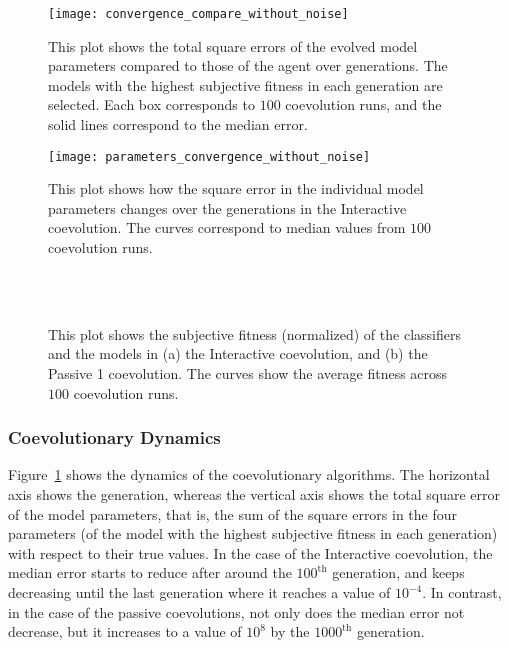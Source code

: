 \begin{figure}[!t]%
	    \centering
		\texttt{[image: convergence\_compare\_without\_noise]}
		\caption{This plot shows the total square errors of the evolved model parameters compared to those of the agent over generations. The models with the highest subjective fitness in each generation are selected. Each box corresponds to $100$ coevolution runs, and the solid lines correspond to the median error.\label{fig:convergence_compare}}
\end{figure}

\begin{figure}[!t]%
	   \centering
	   \texttt{[image: parameters\_convergence\_without\_noise]}
	    \caption{This plot shows how the square error in the individual model parameters
	    changes over the generations in the Interactive coevolution. The curves correspond to median values from $100$ coevolution runs.\label{fig:parameters_convergence}}
\end{figure}

\begin{figure}[!t]%
	\centering
		\\
		\\
		\caption{This plot shows the subjective fitness (normalized) of the classifiers and
		the models in (a) the Interactive coevolution, and (b) the Passive 1 coevolution.
		The curves show the average fitness across $100$ coevolution runs.\label{fig:fitness_dynamics}}
\end{figure}

\subsubsection{Coevolutionary Dynamics}\label{sec:coevolutionary_dynamic_deterministic_interaction}

Figure~\ref{fig:convergence_compare} shows the dynamics of the coevolutionary algorithms. The horizontal axis shows the generation, whereas the vertical axis shows the total square error of the model parameters, that is, the sum of the square errors in the four parameters (of the model with the highest subjective fitness in each generation) with respect to their true values. In the case of the Interactive coevolution, the median error starts to reduce after around the $100^\textrm{th}$ generation,  and keeps decreasing until the last generation where it reaches a value of $10^{-4}$. In contrast, in the case of the passive coevolutions, not only does the median error not decrease, but it increases to a value of $10^{8}$ by the $1000^\textrm{th}$ generation.

